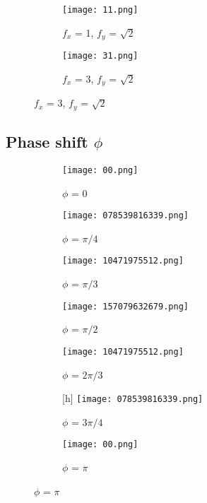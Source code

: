 \documentclass{article}
\begin{document}
\begin{figure}
    \caption{Irrational $f_x$/$f_y$ values}
    \label{Irrationals}

\begin{subfigure}{0.5\textwidth}
    \centering
    \texttt{[image: 11.png]}
    \caption{$f_x$ = 1, $f_y$ =  $\sqrt{2}$}
    \label{1rt2}
\end{subfigure}
\begin{subfigure}{0.5\textwidth}
    \centering
    \texttt{[image: 31.png]}
    \caption{$f_x$ = 3, $f_y$ =  $\sqrt{2}$}
    \label{3rt2}
\end{subfigure}

\end{figure}

\subsection{Phase shift $\phi$}

\begin{figure}
    \caption{$\Phi$ investigation}
    \label{Phi}

\begin{subfigure}{0.5\textwidth}
    \centering
    \texttt{[image: 00.png]}
    \caption{$\phi$ = 0}
    \label{pi0}
\end{subfigure}
\begin{subfigure}{0.5\textwidth}
    \centering
    \texttt{[image: 078539816339.png]}
    \caption{$\phi$ = $\pi/4$}
    \label{pi4}
\end{subfigure}
\begin{subfigure}{0.5\textwidth}
    \centering
    \texttt{[image: 10471975512.png]}
    \caption{$\phi$ = $\pi/3$}
    \label{pi3}
\end{subfigure}  
\begin{subfigure}{0.5\textwidth}
    \centering
    \texttt{[image: 157079632679.png]}
    \caption{$\phi$ = $\pi/2$}
    \label{pi}
\end{subfigure}
\begin{subfigure}{0.5\textwidth}
    \centering
    \texttt{[image: 10471975512.png]}
    \caption{$\phi$ = $2\pi/3$}
    \label{2pi3}
\end{subfigure}
\begin{subfigure}{0.5\textwidth}[h]
    \centering
    \texttt{[image: 078539816339.png]}
    \caption{$\phi$ = $3\pi/4$}
    \label{3pi4}
\end{subfigure}
\begin{subfigure}{0.5\textwidth}
    \centering
    \texttt{[image: 00.png]}
    \caption{$\phi$ = $\pi$}
    \label{pi}
\end{subfigure}
    
\end{figure}
\end{document}
